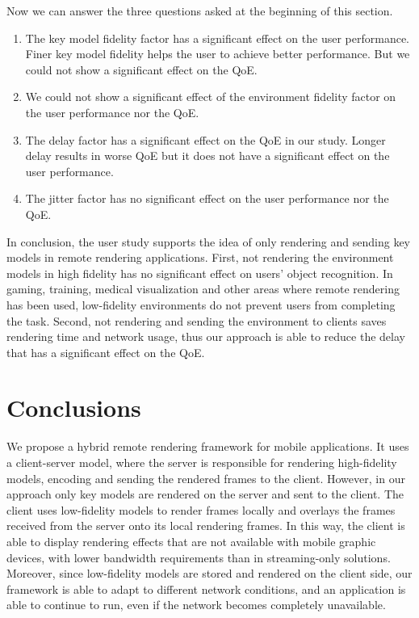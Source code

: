 Now we can answer the three questions asked at the beginning of this section.
\begin{enumerate}
\item
The key model fidelity factor has a significant effect on the user performance. Finer key model fidelity helps the user to achieve better performance. But we could not show a significant effect on the QoE. 
\item
We could not show a significant effect of the environment fidelity factor on the user performance nor the QoE.
\item
The delay factor has a significant effect on the QoE in our study. Longer delay results in worse QoE but it does not have a significant effect on the user performance.
\item
The jitter factor has no significant effect on the user performance nor the QoE.
\end{enumerate}

In conclusion, the user study supports the idea of only rendering and sending key models in remote rendering applications.
First, not rendering the environment models in high fidelity has no significant effect on users' object recognition. In gaming, training, medical visualization and other areas where remote rendering has been used, low-fidelity environments do not prevent users from completing the task.
Second, not rendering and sending the environment to clients saves rendering time and network usage, thus our approach is able to reduce the delay that has a significant effect on the QoE.

\section{Conclusions}

We propose a hybrid remote rendering framework for mobile applications.
It uses a client-server model, where the server is responsible for rendering high-fidelity models, encoding and sending the rendered frames to the client. However, in our approach only key models are rendered on the server and sent to the client. The client uses low-fidelity models to render frames locally and overlays the frames received from the server onto its local rendering frames.
In this way, the client is able to display rendering effects that are not available with mobile graphic devices, with lower bandwidth requirements than in streaming-only solutions.
Moreover, since low-fidelity models are stored and rendered on the client side, our framework is able to adapt to different network conditions, and an application is able to continue to run, even if the network becomes completely unavailable.

